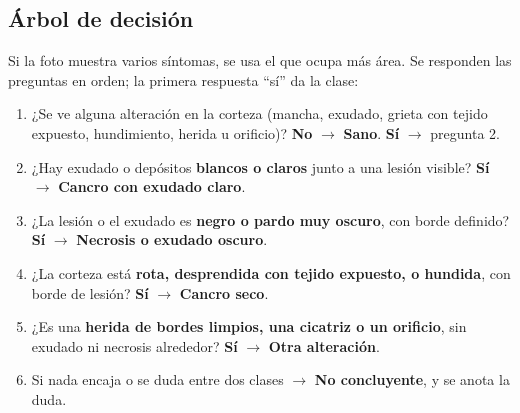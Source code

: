 \documentclass[11pt]{article}
\begin{document}
\subsection{Árbol de decisión}
Si la foto muestra varios síntomas, se usa el que ocupa más área. Se responden las preguntas en orden; la primera respuesta “sí” da la clase:

\begin{enumerate}[leftmargin=1.2em,itemsep=2pt,topsep=2pt]
\item ¿Se ve alguna alteración en la corteza (mancha, exudado, grieta con tejido expuesto, hundimiento, herida u orificio)? \textbf{No} $\rightarrow$ \textbf{Sano}. \textbf{Sí} $\rightarrow$ pregunta 2.
\item ¿Hay exudado o depósitos \textbf{blancos o claros} junto a una lesión visible? \textbf{Sí} $\rightarrow$ \textbf{Cancro con exudado claro}.
\item ¿La lesión o el exudado es \textbf{negro o pardo muy oscuro}, con borde definido? \textbf{Sí} $\rightarrow$ \textbf{Necrosis o exudado oscuro}.
\item ¿La corteza está \textbf{rota, desprendida con tejido expuesto, o hundida}, con borde de lesión? \textbf{Sí} $\rightarrow$ \textbf{Cancro seco}.
\item ¿Es una \textbf{herida de bordes limpios, una cicatriz o un orificio}, sin exudado ni necrosis alrededor? \textbf{Sí} $\rightarrow$ \textbf{Otra alteración}.
\item Si nada encaja o se duda entre dos clases $\rightarrow$ \textbf{No concluyente}, y se anota la duda.
\end{enumerate}
\end{document}
